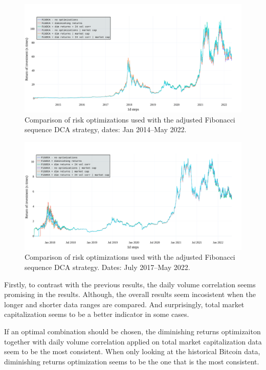 \begin{figure}[!hbt]
    \centering
    \includegraphics[width=\columnwidth]{figures/evaluation-dca-optimization-longer.pdf}
    \caption{Comparison of risk optimizations used with the adjusted Fibonacci sequence DCA strategy, dates: Jan 2014--May 2022.}
    \label{figure-dca-optimization-longer}
\end{figure}

\begin{figure}[!hbt]
    \centering
    \includegraphics[width=\columnwidth]{figures/evaluation-dca-optimization-shorter.pdf}
    \caption{Comparison of risk optimizations used with the adjusted Fibonacci sequence DCA strategy. Dates: July 2017--May 2022.}
    \label{figure-dca-optimization-shorter}
\end{figure}

Firstly, to contrast with the previous results, the daily volume correlation seems promising in the results. Although, the overall results seem incosistent when the longer and shorter data ranges are compared. And surprisingly, total market capitalization seems to be a better indicator in some cases.

If an optimal combination should be chosen, the diminishing returns optimizaiton together with daily volume correlation applied on total market capitalization data seem to be the most consistent. When only looking at the historical Bitcoin data, diminishing returns optimization seems to be the one that is the most consistent.

